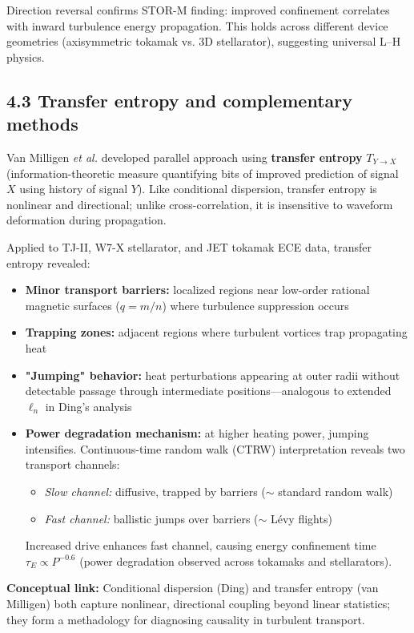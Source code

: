 \documentclass[11pt]{article}
\begin{document}
Direction reversal confirms STOR-M finding: improved confinement correlates with inward turbulence energy propagation. This holds across different device geometries (axisymmetric tokamak vs. 3D stellarator), suggesting universal L–H physics.

\subsection*{4.3 Transfer entropy and complementary methods}

Van Milligen \textit{et al.} developed parallel approach using \textbf{transfer entropy} $T_{Y\to X}$ (information-theoretic measure quantifying bits of improved prediction of signal $X$ using history of signal $Y$). Like conditional dispersion, transfer entropy is nonlinear and directional; unlike cross-correlation, it is insensitive to waveform deformation during propagation.

Applied to TJ-II, W7-X stellarator, and JET tokamak ECE data, transfer entropy revealed:
\begin{itemize}
\item \textbf{Minor transport barriers:} localized regions near low-order rational magnetic surfaces ($q=m/n$) where turbulence suppression occurs
\item \textbf{Trapping zones:} adjacent regions where turbulent vortices trap propagating heat
\item \textbf{"Jumping" behavior:} heat perturbations appearing at outer radii without detectable passage through intermediate positions—analogous to extended $\ell_n$ in Ding's analysis
\item \textbf{Power degradation mechanism:} at higher heating power, jumping intensifies. Continuous-time random walk (CTRW) interpretation reveals two transport channels:
  \begin{itemize}
  \item \emph{Slow channel:} diffusive, trapped by barriers ($\sim$ standard random walk)
  \item \emph{Fast channel:} ballistic jumps over barriers ($\sim$ Lévy flights)
  \end{itemize}
  Increased drive enhances fast channel, causing energy confinement time $\tau_E \propto P^{-0.6}$ (power degradation observed across tokamaks and stellarators).
\end{itemize}

\textbf{Conceptual link:} Conditional dispersion (Ding) and transfer entropy (van Milligen) both capture nonlinear, directional coupling beyond linear statistics; they form a methadology for diagnosing causality in turbulent transport.
\end{document}

